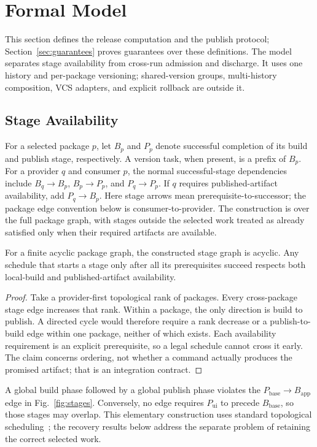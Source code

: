 \section{Formal Model}
\label{sec:model}

This section defines the release computation and the publish protocol;
Section~\ref{sec:guarantees} proves guarantees over these definitions.
The model separates stage availability from cross-run admission and discharge.
It uses one history and per-package versioning; shared-version groups,
multi-history composition, VCS adapters, and explicit rollback are outside it.


\subsection{Stage Availability}
For a selected package $p$, let $B_p$ and $P_p$ denote successful completion
of its build and publish stage, respectively. A version task, when present,
is a prefix of $B_p$. For a provider $q$ and consumer $p$, the normal
successful-stage dependencies include $B_q\to B_p$, $B_p\to P_p$, and
$P_q\to P_p$. If $q$ requires published-artifact availability, add
$P_q\to B_p$. Here stage arrows mean prerequisite-to-successor; the package
edge convention below is consumer-to-provider. The construction is over the
full package graph, with stages outside the selected work treated as already
satisfied only when their required artifacts are available.

\begin{proposition}
\label{prop:stages}
For a finite acyclic package graph, the constructed stage graph is acyclic.
Any schedule that starts a stage only after all its prerequisites succeed
respects both local-build and published-artifact availability.
\end{proposition}
\begin{proof}
Take a provider-first topological rank of packages. Every cross-package stage
edge increases that rank. Within a package, the only direction is build to
publish. A directed cycle would therefore require a rank decrease or a
publish-to-build edge within one package, neither of which exists. Each
availability requirement is an explicit prerequisite, so a legal schedule
cannot cross it early. The claim concerns ordering, not whether a command
actually produces the promised artifact; that is an integration contract.
\end{proof}

A global build phase followed by a global publish phase violates the
$P_{\mathrm{base}}\to B_{\mathrm{app}}$ edge in Fig.~\ref{fig:stages}.
Conversely, no edge requires $P_{\mathrm{ui}}$ to precede
$B_{\mathrm{base}}$, so those stages may overlap. This elementary construction
uses standard topological scheduling~\cite{kahn,mokhov}; the recovery results
below address the separate problem of retaining the correct selected work.

